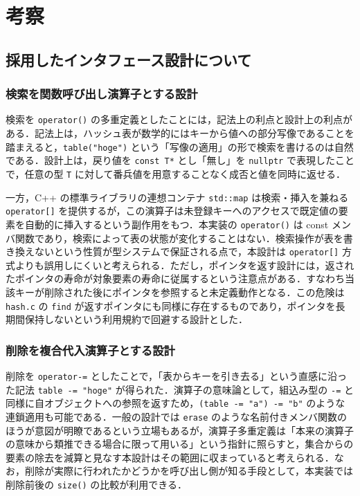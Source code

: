 \section{考察}

\subsection{採用したインタフェース設計について}

\subsubsection{検索を関数呼び出し演算子とする設計}

検索を {\tt operator()} の多重定義としたことには，記法上の利点と設計上の利点がある．記法上は，ハッシュ表が数学的にはキーから値への部分写像であることを踏まえると，{\tt table("hoge")} という「写像の適用」の形で検索を書けるのは自然である．設計上は，戻り値を {\tt const T*} とし「無し」を {\tt nullptr} で表現したことで，任意の型 {\tt T} に対して番兵値を用意することなく成否と値を同時に返せる．

一方，C++ の標準ライブラリの連想コンテナ {\tt std::map} は検索・挿入を兼ねる {\tt operator[]} を提供するが，この演算子は未登録キーへのアクセスで既定値の要素を自動的に挿入するという副作用をもつ．本実装の {\tt operator()} は const メンバ関数であり，検索によって表の状態が変化することはない．検索操作が表を書き換えないという性質が型システムで保証される点で，本設計は {\tt operator[]} 方式よりも誤用しにくいと考えられる．ただし，ポインタを返す設計には，返されたポインタの寿命が対象要素の寿命に従属するという注意点がある．すなわち当該キーが削除された後にポインタを参照すると未定義動作となる．この危険は {\tt hash.c} の {\tt find} が返すポインタにも同様に存在するものであり，ポインタを長期間保持しないという利用規約で回避する設計とした．

\subsubsection{削除を複合代入演算子とする設計}

削除を {\tt operator-=} としたことで，「表からキーを引き去る」という直感に沿った記法 {\tt table -= "hoge"} が得られた．演算子の意味論として，組込み型の {\tt -=} と同様に自オブジェクトへの参照を返すため，{\tt (table -= "a") -= "b"} のような連鎖適用も可能である．一般の設計では {\tt erase} のような名前付きメンバ関数のほうが意図が明瞭であるという立場もあるが，演算子多重定義は「本来の演算子の意味から類推できる場合に限って用いる」という指針に照らすと，集合からの要素の除去を減算と見なす本設計はその範囲に収まっていると考えられる．なお，削除が実際に行われたかどうかを呼び出し側が知る手段として，本実装では削除前後の {\tt size()} の比較が利用できる．

